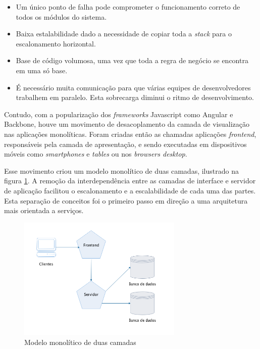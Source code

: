 \begin{itemize}
    \item Um único ponto de falha pode comprometer o funcionamento correto de todos os módulos do sistema.
    \item Baixa estalabilidade dado a necessidade de copiar toda a \textit{stack} para o escalonamento horizontal.
    \item Base de código volumosa, uma vez que toda a regra de negócio se encontra em uma só base.
    \item É necessário muita comunicação para que várias equipes de desenvolvedores trabalhem em paralelo. Esta sobrecarga diminui o ritmo de desenvolvimento.
\end{itemize}

Contudo, com a popularização dos \textit{frameworks} Javascript como Angular e Backbone, houve um movimento de desacoplamento da camada de visualização nas aplicações monolíticas. Foram criadas então as chamadas aplicações \textit{frontend}, responsáveis pela camada de apresentação, e sendo executadas em dispositivos móveis como \textit{smartphones} e \textit{tables} ou nos \textit{browsers desktop}. 

Esse movimento criou um modelo monolítico de duas camadas, ilustrado na figura \ref{fig:two-tier-monolithic}. A remoção da interdependência entre as camadas de interface e servidor de aplicação facilitou o escalonamento e a escalabilidade de cada uma das partes. Esta separação de conceitos foi o primeiro passo em direção a uma arquitetura mais orientada a serviços.

\begin{figure}[htbp]
    \centering
    \includegraphics[width=0.7\textwidth]{figuras/monolithic-2-tier.png}
    \caption{Modelo monolítico de duas camadas}
    \label{fig:two-tier-monolithic}
\end{figure}

